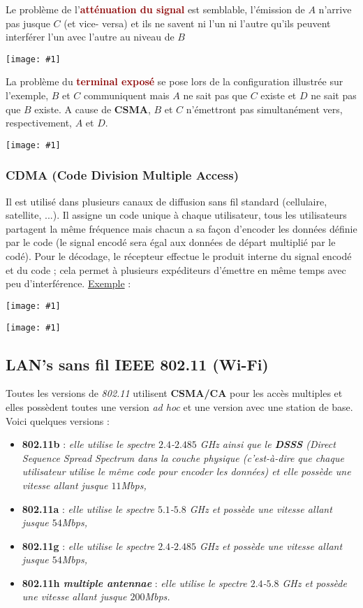 \documentclass{article}
\newcommand{\dred}[1]{\textcolor{darkred}{\textbf{#1}}}
\newcommand{\imgR}[2]{\begin{center}\texttt{[image: \#1]}\end{center}}
\newcommand{\bfp}[2]{\item \textbf{#1} : \textit{#2}}
\begin{document}
\begin{multicols}{2}
Le problème de l'\dred{atténuation du signal} est semblable, l'émission de $A$ n'arrive pas jusque $C$ (et vice-
versa) et ils ne savent ni l'un ni l'autre qu'ils peuvent interférer l'un avec l'autre au niveau de $B$
\imgR{CN_147.png}{125}
\end{multicols}

\begin{multicols}{2}
La problème du \dred{terminal exposé} se pose lors de la configuration illustrée sur l'exemple, $B$ et $C$ 
communiquent mais $A$ ne sait pas que $C$ existe et $D$ ne sait pas que $B$ existe. A cause de \textbf{CSMA}, $B$ 
et $C$ n'émettront pas simultanément vers, respectivement, $A$ et $D$.
\imgR{CN_148.png}{125}
\end{multicols}

\subsubsection{CDMA (Code Division Multiple Access)}

Il est utilisé dans plusieurs canaux de diffusion sans fil standard (cellulaire, satellite, ...). Il assigne un 
code unique à chaque utilisateur, tous les utilisateurs partagent la même fréquence mais chacun a sa façon 
d'encoder les données définie par le code (le signal encodé sera égal aux données de départ multiplié par le 
codé). Pour le décodage, le récepteur effectue le produit interne du signal encodé et du code ; cela permet à 
plusieurs expéditeurs d'émettre en même temps avec peu d'interférence. 
\newpage
\underline{Exemple} : 
\imgR{CN_149.png}{400}
\imgR{CN_150.png}{400}

\subsection{LAN's sans fil IEEE 802.11 (Wi-Fi)}

\noindent Toutes les versions de \textit{802.11} utilisent \textbf{CSMA/CA} pour les accès multiples et elles 
possèdent toutes une version \textit{ad hoc} et une version avec une station de base. Voici quelques versions :
\begin{itemize}
\bfp{802.11b}{elle utilise le spectre $2.4$-$2.485$ GHz ainsi que le \textbf{DSSS} \textit{(Direct Sequence 
Spread Spectrum} dans la couche physique (c'est-à-dire que chaque utilisateur utilise le même code pour encoder 
les données) et elle possède une vitesse allant jusque $11$Mbps,}
\bfp{802.11a}{elle utilise le spectre $5.1$-$5.8$ GHz et possède une vitesse allant jusque $54$Mbps,}
\bfp{802.11g}{elle utilise le spectre $2.4$-$2.485$ GHz et possède une vitesse allant jusque $54$Mbps,}
\bfp{802.11h \textit{multiple antennae}}{elle utilise le spectre $2.4$-$5.8$ GHz et possède une vitesse allant 
jusque $200$Mbps.} \\
\end{itemize}
\end{document}
